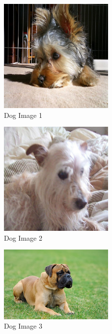 \begin{figure}[h]
   \centering
   \includegraphics[width=0.5\textwidth]{../test-pictures/dog/dog1.jpg}
   \caption{ Dog Image 1}
   \label{fig:dog1}
\end{figure}

\begin{figure}[h]
   \centering
   \includegraphics[width=0.5\textwidth]{../test-pictures/dog/dog2.jpg}
   \caption{Dog Image 2}
   \label{fig:dog2}
\end{figure}

\begin{figure}[h]
   \centering
   \includegraphics[width=0.5\textwidth]{../test-pictures/dog/dog3.jpg}
   \caption{Dog Image 3}
   \label{fig:dog3}
\end{figure}

